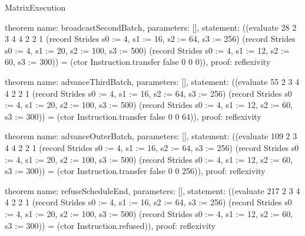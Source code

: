 \begin{lexlean}{MatrixExecution}
\begin{semanticmodule}
theorem{
  name: broadcastSecondBatch,
  parameters: [],
  statement: ((evaluate 28 2 3 4 4 2 2 1 (record Strides {s0 := 4, s1 := 16, s2 := 64, s3 := 256}) (record Strides {s0 := 4, s1 := 20, s2 := 100, s3 := 500}) (record Strides {s0 := 4, s1 := 12, s2 := 60, s3 := 300})) = (ctor Instruction.transfer false 0 0 0)),
  proof: reflexivity{}
}

theorem{
  name: advanceThirdBatch,
  parameters: [],
  statement: ((evaluate 55 2 3 4 4 2 2 1 (record Strides {s0 := 4, s1 := 16, s2 := 64, s3 := 256}) (record Strides {s0 := 4, s1 := 20, s2 := 100, s3 := 500}) (record Strides {s0 := 4, s1 := 12, s2 := 60, s3 := 300})) = (ctor Instruction.transfer false 0 0 64)),
  proof: reflexivity{}
}

theorem{
  name: advanceOuterBatch,
  parameters: [],
  statement: ((evaluate 109 2 3 4 4 2 2 1 (record Strides {s0 := 4, s1 := 16, s2 := 64, s3 := 256}) (record Strides {s0 := 4, s1 := 20, s2 := 100, s3 := 500}) (record Strides {s0 := 4, s1 := 12, s2 := 60, s3 := 300})) = (ctor Instruction.transfer false 0 0 256)),
  proof: reflexivity{}
}

theorem{
  name: refuseScheduleEnd,
  parameters: [],
  statement: ((evaluate 217 2 3 4 4 2 2 1 (record Strides {s0 := 4, s1 := 16, s2 := 64, s3 := 256}) (record Strides {s0 := 4, s1 := 20, s2 := 100, s3 := 500}) (record Strides {s0 := 4, s1 := 12, s2 := 60, s3 := 300})) = (ctor Instruction.refused)),
  proof: reflexivity{}
}
\end{semanticmodule}
\end{lexlean}
